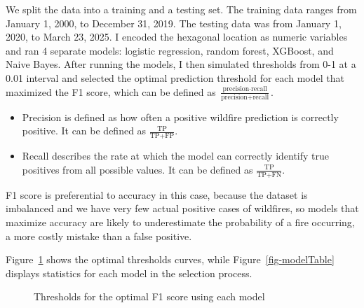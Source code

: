 \documentclass[
  12pt,
  letterpaper,
  DIV=11,
  numbers=noendperiod]{scrartcl}
\providecommand{\tightlist}{%
  \setlength{\itemsep}{0pt}\setlength{\parskip}{0pt}}\usepackage{longtable,booktabs,array}
\begin{document}
We split the data into a training and a testing set. The training data
ranges from January 1, 2000, to December 31, 2019. The testing data was
from January 1, 2020, to March 23, 2025. I encoded the hexagonal
location as numeric variables and ran 4 separate models: logistic
regression, random forest, XGBoost, and Naive Bayes. After running the
models, I then simulated thresholds from 0-1 at a 0.01 interval and
selected the optimal prediction threshold for each model that maximized
the F1 score, which can be defined as
\(\frac{\text{precision} \cdot \text{recall}}{\text{precision} + \text{recall}}\).

\begin{itemize}
\tightlist
\item
  Precision is defined as how often a positive wildfire prediction is
  correctly positive. It can be defined as
  \(\frac{\text{TP}}{\text{TP} + \text{FP}}\).\\
\item
  Recall describes the rate at which the model can correctly identify
  true positives from all possible values. It can be defined as
  \(\frac{\text{TP}}{\text{TP} + \text{FN}}\).
\end{itemize}

F1 score is preferential to accuracy in this case, because the dataset
is imbalanced and we have very few actual positive cases of wildfires,
so models that maximize accuracy are likely to underestimate the
probability of a fire occurring, a more costly mistake than a false
positive.

Figure~\ref{fig-thresholds} shows the optimal thresholds curves, while
Figure~\ref{fig-modelTable} displays statistics for each model in the
selection process.

\begin{figure}[H]


\caption{\label{fig-thresholds}Thresholds for the optimal F1 score using
each model}

\end{figure}%
\end{document}

